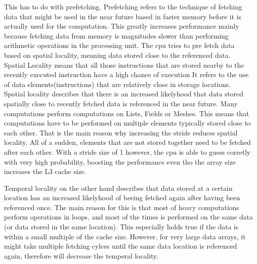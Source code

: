 \documentclass[a4paper,10pt]{article}
\begin{document}
  This has to do with prefetching.
  Prefetching refers to the technique of fetching data that might be used in the near future based in faster memory before it is actually used for the computation.
  This greatly increases performance mainly because fetching data from memory is magnitudes slower than performing arithmetic operations in the processing unit.
  The cpu tries to pre fetch data based on spatial locality, meaning data stored close to the referenced data.
  Spatial Locality means that all those instructions that are stored nearby to the recently executed instruction have a high chance of execution
  It refers to the use of data elements(instructions) that are relatively close in storage locations.
  Spatial locality describes that there is an increased likelyhood that data stored spatially close to recently fetched data is referenced in the near future.
  Many computations perform computations on Lists, Fields or Meshes.
  This means that computations have to be performed on multiple elements typically stored close to each other.
  That is the main reason why increasing the stride reduces spatial locality.
  All of a sudden, elements that are not stored together need to be fetched after each other.
  With a stride size of 1 however, the cpu is able to guess corretly with very high probability, boosting the performance even tho the array size increases the L3 cache size.

  Temporal locality on the other hand describes that data stored at a certain location has an increased likelyhood of beeing fetched again after having been referenced once.
  The main reason for this is that most of heavy computations perform operations in loops, and most of the times is performed on the same data (or data stored in the same location).
  This especially holds true if the data is within a small multiple of the cache size.
  However, for very large data arrays, it might take multiple fetching cylces until the same data location is referenced again, therefore will decrease the temperal locality.
   
 
 
 
\end{document}
